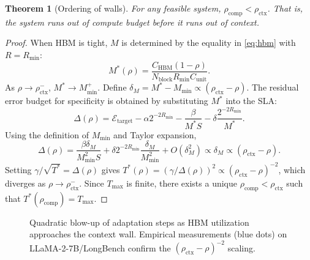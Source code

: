 \documentclass[11pt,a4paper]{article}
\theoremstyle{plain}
\newtheorem{theorem}{Theorem}[section]
\theoremstyle{definition}
\begin{document}
\begin{theorem}[Ordering of walls]
For any feasible system, $\rho_{\text{comp}} < \rho_{\text{ctx}}$. That is, the system runs out of compute budget before it runs out of context.
\end{theorem}
\begin{proof}
When HBM is tight, $M$ is determined by the equality in \eqref{eq:hbm} with $R=R_{\min}$:
\begin{equation}
    M^*(\rho) = \frac{C_{\text{HBM}}(1-\rho)}{N_{\text{block}} R_{\min} C_{\text{unit}}}. \label{eq:Mlin}
\end{equation}
As $\rho \to \rho_{\text{ctx}}^-$, $M^* \to M_{\min}^+$. Define $\delta_M = M^*-M_{\min} \propto (\rho_{\text{ctx}}-\rho)$. The residual error budget for specificity is obtained by substituting $M^*$ into the SLA:
\begin{equation}
    \Delta(\rho) = \mathcal{E}_{\text{target}} - \alpha 2^{-2R_{\min}} - \frac{\beta}{M^* S} - \delta \frac{2^{-2R_{\min}}}{M^*}.
\end{equation}
Using the definition of $M_{\min}$ and Taylor expansion,
\begin{equation}
    \Delta(\rho) = \frac{\beta \delta_M}{M_{\min}^2 S} + \delta 2^{-2R_{\min}} \frac{\delta_M}{M_{\min}^2} + O(\delta_M^2) \propto \delta_M \propto (\rho_{\text{ctx}}-\rho).
\end{equation}
Setting $\gamma/\sqrt{T^*} = \Delta(\rho)$ gives $T^*(\rho) = (\gamma/\Delta(\rho))^2 \propto (\rho_{\text{ctx}}-\rho)^{-2}$, which diverges as $\rho \to \rho_{\text{ctx}}^-$. Since $T_{\max}$ is finite, there exists a unique $\rho_{\text{comp}} < \rho_{\text{ctx}}$ such that $T^*(\rho_{\text{comp}}) = T_{\max}$.
\end{proof}

\begin{figure}[t]
\centering
{}
\caption{Quadratic blow-up of adaptation steps as HBM utilization approaches the context wall. Empirical measurements (blue dots) on LLaMA-2-7B/LongBench confirm the $(\rho_{\text{ctx}}-\rho)^{-2}$ scaling.}
\label{fig:blowup}
\end{figure}
\end{document}
